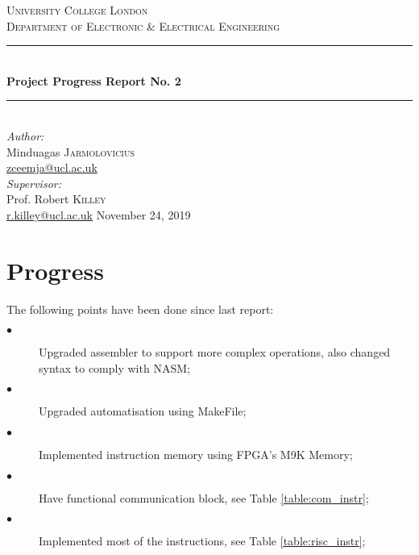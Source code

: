 \documentclass[a4paper,11pt]{article}
\begin{document}
\begin{titlepage}
	\newcommand{\HRule}{\rule{\linewidth}{0.5mm}}
	\center
	\textsc{\Large University College London}\\[0.5cm]
	\textsc{\large Department of Electronic \& Electrical Engineering}\\[0.5cm]
	
	\HRule \\[0.4cm]
	{ \huge \bfseries Project Progress Report No. 2}\\[0.4cm]
	\HRule \\[1.0cm]
	
	\Large \emph{Author:}\\
	Minduagas \textsc{Jarmolovicius}\\
	\href{mailto:zceemja@ucl.ac.uk}{zceemja@ucl.ac.uk}\\[0.5cm]
	
	\Large \emph{Supervisor:}\\
	Prof. Robert \textsc{Killey}\\
	\href{mailto:r.killey@ucl.ac.uk}{r.killey@ucl.ac.uk}
	\vfill
	{\large November 24, 2019}\\[2cm]
	
\end{titlepage}

	

\pagebreak
\section{Progress}
The following points have been done since last report:
\begin{description}
	\item[$\bullet$] Upgraded assembler to support more complex operations, also changed syntax to comply with NASM;
	\item[$\bullet$] Upgraded automatisation using MakeFile;
	\item[$\bullet$] Implemented instruction memory using FPGA's M9K Memory;
	\item[$\bullet$] Have functional communication block, see Table \ref{table:com_instr};
	\item[$\bullet$] Implemented most of the instructions, see Table  \ref{table:risc_instr};
\end{description}
\end{document}
